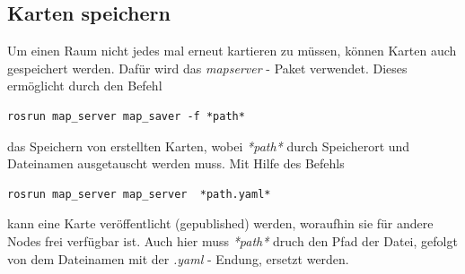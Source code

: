 {	\subsection{Karten speichern}
	{
		Um einen Raum nicht jedes mal erneut kartieren zu müssen, können Karten auch gespeichert werden. Dafür wird das \emph{map\tus server} - Paket verwendet. Dieses ermöglicht durch den Befehl 
		\begin{lstlisting}
rosrun map_server map_saver -f *path*
		\end{lstlisting}
	das Speichern von erstellten Karten, wobei \emph{*path*} durch Speicherort und Dateinamen ausgetauscht werden muss. Mit Hilfe des Befehls
		\begin{lstlisting}
rosrun map_server map_server  *path.yaml*
		\end{lstlisting}
	kann eine Karte veröffentlicht (gepublished) werden, woraufhin sie für andere Nodes frei verfügbar ist. Auch hier muss \emph{*path*} druch den Pfad der Datei, gefolgt von dem Dateinamen mit der \emph{.yaml} - Endung, ersetzt werden.
	}
}